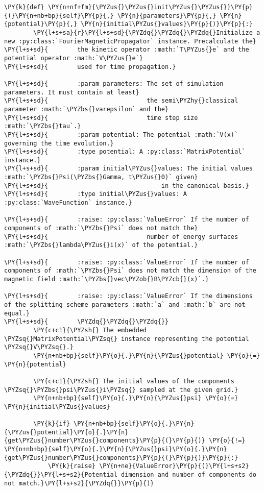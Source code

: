 \begin{Verbatim}[commandchars=\\\{\}]
    \PY{k}{def} \PY{n+nf+fm}{\PYZus{}\PYZus{}init\PYZus{}\PYZus{}}\PY{p}{(}\PY{n+nb+bp}{self}\PY{p}{,} \PY{n}{parameters}\PY{p}{,} \PY{n}{potential}\PY{p}{,} \PY{n}{initial\PYZus{}values}\PY{p}{)}\PY{p}{:}
        \PY{l+s+sa}{r}\PY{l+s+sd}{\PYZdq{}\PYZdq{}\PYZdq{}Initialize a new :py:class:`FourierMagneticPropagator` instance. Precalculate the}
\PY{l+s+sd}{        the kinetic operator :math:`T\PYZus{}e` and the potential operator :math:`V\PYZus{}e`}
\PY{l+s+sd}{        used for time propagation.}

\PY{l+s+sd}{        :param parameters: The set of simulation parameters. It must contain at least}
\PY{l+s+sd}{                           the semi\PYZhy{}classical parameter :math:`\PYZbs{}varepsilon` and the}
\PY{l+s+sd}{                           time step size :math:`\PYZbs{}tau`.}
\PY{l+s+sd}{        :param potential: The potential :math:`V(x)` governing the time evolution.}
\PY{l+s+sd}{        :type potential: A :py:class:`MatrixPotential` instance.}
\PY{l+s+sd}{        :param initial\PYZus{}values: The initial values :math:`\PYZbs{}Psi(\PYZbs{}Gamma, t\PYZus{}0)` given}
\PY{l+s+sd}{                               in the canonical basis.}
\PY{l+s+sd}{        :type initial\PYZus{}values: A :py:class:`WaveFunction` instance.}

\PY{l+s+sd}{        :raise: :py:class:`ValueError` If the number of components of :math:`\PYZbs{}Psi` does not match the}
\PY{l+s+sd}{                           number of energy surfaces :math:`\PYZbs{}lambda\PYZus{}i(x)` of the potential.}

\PY{l+s+sd}{        :raise: :py:class:`ValueError` If the number of components of :math:`\PYZbs{}Psi` does not match the dimension of the magnetic field :math:`\PYZbs{}vec\PYZob{}B\PYZcb{}(x)`.}

\PY{l+s+sd}{        :raise: :py:class:`ValueError` If the dimensions of the splitting scheme parameters :math:`a` and :math:`b` are not equal.}
\PY{l+s+sd}{        \PYZdq{}\PYZdq{}\PYZdq{}}
        \PY{c+c1}{\PYZsh{} The embedded \PYZsq{}MatrixPotential\PYZsq{} instance representing the potential \PYZsq{}V\PYZsq{}.}
        \PY{n+nb+bp}{self}\PY{o}{.}\PY{n}{\PYZus{}potential} \PY{o}{=} \PY{n}{potential}

        \PY{c+c1}{\PYZsh{} The initial values of the components \PYZsq{}\PYZbs{}psi\PYZus{}i\PYZsq{} sampled at the given grid.}
        \PY{n+nb+bp}{self}\PY{o}{.}\PY{n}{\PYZus{}psi} \PY{o}{=} \PY{n}{initial\PYZus{}values}

        \PY{k}{if} \PY{n+nb+bp}{self}\PY{o}{.}\PY{n}{\PYZus{}potential}\PY{o}{.}\PY{n}{get\PYZus{}number\PYZus{}components}\PY{p}{(}\PY{p}{)} \PY{o}{!=} \PY{n+nb+bp}{self}\PY{o}{.}\PY{n}{\PYZus{}psi}\PY{o}{.}\PY{n}{get\PYZus{}number\PYZus{}components}\PY{p}{(}\PY{p}{)}\PY{p}{:}
            \PY{k}{raise} \PY{n+ne}{ValueError}\PY{p}{(}\PY{l+s+s2}{\PYZdq{}}\PY{l+s+s2}{Potential dimension and number of components do not match.}\PY{l+s+s2}{\PYZdq{}}\PY{p}{)}


\end{Verbatim}
